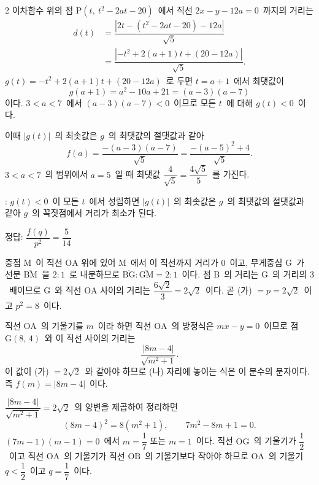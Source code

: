 \documentclass[10pt,fleqn]{article}
\begin{document}
\begin{multicols*}{2}
이차함수 위의 점 $\mathrm{P}(t,\ t^2 - 2at - 20)$\ 에서 직선 $2x - y - 12a = 0$\ 까지의 거리는
\begin{align*}
  d(t) &= \dfrac{|2t - (t^2 - 2at - 20) - 12a|}{\sqrt{5}}\\
       &= \dfrac{|{-t^2 + 2(a+1)t + (20 - 12a)}|}{\sqrt{5}}.
\end{align*}
$g(t) = -t^2 + 2(a+1)t + (20 - 12a)$\ 로 두면 $t = a+1$\ 에서 최댓값이
$$g(a+1) = a^2 - 10a + 21 = (a-3)(a-7)$$
이다. $3 < a < 7$\ 에서 $(a-3)(a-7) < 0$\ 이므로 모든 $t$\ 에 대해 $g(t) < 0$\ 이다.

이때 $|g(t)|$\ 의 최솟값은 $g$\ 의 최댓값의 절댓값과 같아
$$f(a) = \dfrac{-(a-3)(a-7)}{\sqrt{5}} = \dfrac{-(a-5)^2 + 4}{\sqrt{5}}.$$
$3 < a < 7$\ 의 범위에서 $a = 5$\ 일 때 최댓값 $\dfrac{4}{\sqrt{5}} = \dfrac{4\sqrt{5}}{5}$\ 를 가진다.

\begin{dmcriticalpoint}
: $g(t) < 0$\ 이 모든 $t$\ 에서 성립하면 $|g(t)|$\ 의 최솟값은 $g$\ 의 최댓값의 절댓값과 같아 $g$\ 의 꼭짓점에서 거리가 최소가 된다.
\end{dmcriticalpoint}

\begin{dmanswerbox}
정답: $\dfrac{f(q)}{p^2}=\dfrac{5}{14}$
\end{dmanswerbox}

 중점 $\mathrm{M}$\ 이 직선 $\mathrm{OA}$ 위에 있어 $\mathrm{M}$\ 에서 이 직선까지 거리가 $0$\ 이고, 무게중심 $\mathrm{G}$\ 가 선분 $\overline{\mathrm{BM}}$\ 을 $2 : 1$\ 로 내분하므로 $\overline{\mathrm{BG}} : \overline{\mathrm{GM}} = 2 : 1$\ 이다. 점 $\mathrm{B}$\ 의 거리는 $\mathrm{G}$\ 의 거리의 $3$\ 배이므로 $\mathrm{G}$\ 와 직선 $\mathrm{OA}$ 사이의 거리는 $\dfrac{6\sqrt{2}}{3} = 2\sqrt{2}$\ 이다. 곧 (가) $= p = 2\sqrt{2}$\ 이고 $p^2 = 8$\ 이다.

 직선 $\mathrm{OA}$\ 의 기울기를 $m$\ 이라 하면 직선 $\mathrm{OA}$\ 의 방정식은 $mx - y = 0$\ 이므로 점 $\mathrm{G}(8,\, 4)$\ 와 이 직선 사이의 거리는
\[ \dfrac{|8m - 4|}{\sqrt{m^2 + 1}}. \]
이 값이 (가) $= 2\sqrt{2}$\ 와 같아야 하므로 (나) 자리에 놓이는 식은 이 분수의 분자이다. 즉 $f(m) = |8m - 4|$\ 이다.

 $\dfrac{|8m - 4|}{\sqrt{m^2 + 1}} = 2\sqrt{2}$\ 의 양변을 제곱하여 정리하면
$$(8m - 4)^2 = 8(m^2 + 1),\qquad 7m^2 - 8m + 1 = 0.$$
$(7m - 1)(m - 1) = 0$\ 에서 $m = \dfrac{1}{7}$ 또는 $m = 1$\ 이다. 직선 $\mathrm{OG}$\ 의 기울기가 $\dfrac{1}{2}$\ 이고 직선 $\mathrm{OA}$\ 의 기울기가 직선 $\mathrm{OB}$\ 의 기울기보다 작아야 하므로 $\mathrm{OA}$\ 의 기울기 $q < \dfrac{1}{2}$\ 이고 $q = \dfrac{1}{7}$\ 이다.


\end{multicols*}
\end{document}
